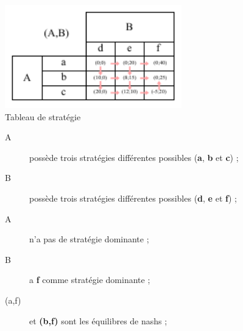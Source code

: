 \begin{center}
	\includegraphics[height=4.5cm]{images/strategie.pdf}\\
	Tableau de stratégie
\end{center}
\begin{description}
	\item [A] possède trois stratégies différentes possibles (\textbf{a}, \textbf{b} et \textbf{c}) ;
	\item [B] possède trois stratégies différentes possibles (\textbf{d}, \textbf{e} et \textbf{f}) ;
	\item [A] n'a pas de stratégie dominante ;
	\item [B] a \textbf{f} comme stratégie dominante ;
	\item [(a,f)] et \textbf{(b,f)} sont les équilibres de nashs ;
\end{description}